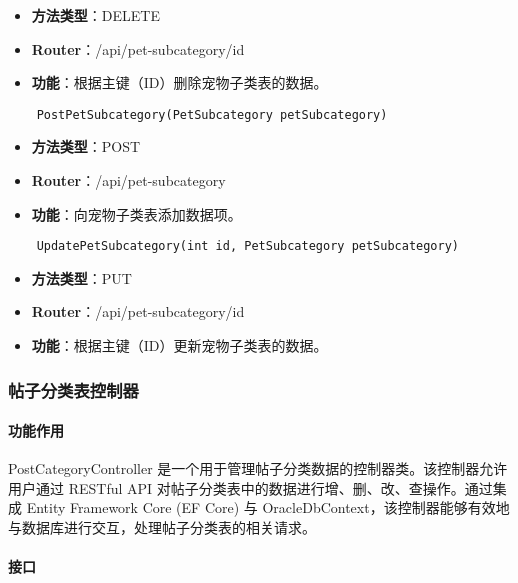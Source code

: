 \begin{itemize}
	\item \textbf{方法类型}：DELETE
	\item \textbf{Router}：/api/pet-subcategory/{id}
	\item \textbf{功能}：根据主键（ID）删除宠物子类表的数据。
\end{itemize}

\begin{verbatim}
	PostPetSubcategory(PetSubcategory petSubcategory)
\end{verbatim}

\begin{itemize}
	\item \textbf{方法类型}：POST
	\item \textbf{Router}：/api/pet-subcategory
	\item \textbf{功能}：向宠物子类表添加数据项。
\end{itemize}

\begin{verbatim}
	UpdatePetSubcategory(int id, PetSubcategory petSubcategory)
\end{verbatim}

\begin{itemize}
	\item \textbf{方法类型}：PUT
	\item \textbf{Router}：/api/pet-subcategory/{id}
	\item \textbf{功能}：根据主键（ID）更新宠物子类表的数据。
\end{itemize}

\subsubsection{帖子分类表控制器}

\paragraph{功能作用}

PostCategoryController 是一个用于管理帖子分类数据的控制器类。该控制器允许用户通过 RESTful API 对帖子分类表中的数据进行增、删、改、查操作。通过集成 Entity Framework Core (EF Core) 与 OracleDbContext，该控制器能够有效地与数据库进行交互，处理帖子分类表的相关请求。

\paragraph{接口}

